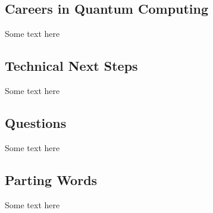 \documentclass{article}
\begin{document}
\subsection{Careers in Quantum Computing}

Some text here

\subsection{Technical Next Steps}

Some text here

\subsection{Questions}

Some text here

\subsection{Parting Words}

Some text here
\end{document}
